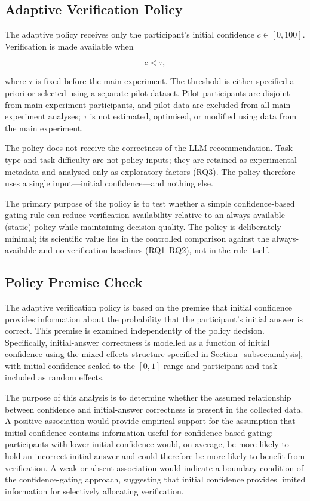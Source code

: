 \documentclass[oneside,final,14pt,a4paper]{extreport}
\begin{document}
\subsection{Adaptive Verification Policy}
\label{subsec:policy}

The adaptive policy receives only the participant's initial confidence
 $c\in[0,100]$. Verification is made available when

\[
c < \tau,
\]

where $\tau$ is fixed before the main experiment. The threshold is either
specified a priori or selected using a separate pilot dataset. Pilot
participants are disjoint from main-experiment participants, and pilot data
are excluded from all main-experiment analyses; $\tau$ is not estimated,
optimised, or modified using data from the main experiment.

The policy does not receive the correctness of the LLM recommendation. Task
type and task difficulty are not policy inputs; they are retained as
experimental metadata and analysed only as exploratory factors (RQ3). The
policy therefore uses a single input---initial confidence---and nothing else.

The primary purpose of the policy is to test whether a simple
confidence-based gating rule can reduce verification availability relative to
an always-available (static) policy while maintaining decision quality. The
policy is deliberately minimal; its scientific value lies in the controlled
comparison against the always-available and no-verification baselines
(RQ1--RQ2), not in the rule itself.

\subsection{Policy Premise Check}
\label{subsec:premise}

The adaptive verification policy is based on the premise that initial
confidence provides information about the probability that the participant's
initial answer is correct. This premise is examined independently of the
policy decision. Specifically, initial-answer correctness is modelled as a
function of initial confidence using the mixed-effects structure specified in
Section~\ref{subsec:analysis}, with initial confidence scaled to the $[0,1]$ range and participant and task included as random effects.

The purpose of this analysis is to determine whether the assumed relationship
between confidence and initial-answer correctness is present in the collected
data. A positive association would provide empirical support for the
assumption that initial confidence contains information useful for
confidence-based gating: participants with lower initial confidence would, on
average, be more likely to hold an incorrect initial answer and could
therefore be more likely to benefit from verification. A weak or absent
association would indicate a boundary condition of the confidence-gating
approach, suggesting that initial confidence provides limited information for
selectively allocating verification.
\end{document}
